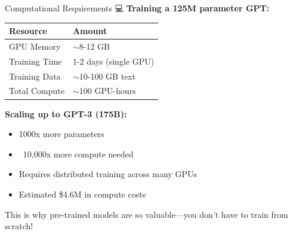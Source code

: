 \documentclass[aspectratio=169]{beamer}
\begin{document}
\begin{frame}{Computational Requirements 💻}
\small
    \textbf{Training a 125M parameter GPT:}

    \vspace{0.3cm}

    \begin{table}
        \begin{tabular}{ll}
            \toprule
            \textbf{Resource} & \textbf{Amount} \\
            \midrule
            GPU Memory & $\sim$8-12 GB \\
            Training Time & 1-2 days (single GPU) \\
            Training Data & $\sim$10-100 GB text \\
            Total Compute & $\sim$100 GPU-hours \\
            \bottomrule
        \end{tabular}
    \end{table}

    \vspace{0.3cm}

    \textbf{Scaling up to GPT-3 (175B):}
    \begin{itemize}\setlength{\itemsep}{0pt}
        \item 1000x more parameters
        \item ~10,000x more compute needed
        \item Requires distributed training across many GPUs
        \item Estimated \$4.6M in compute costs
    \end{itemize}

    \vspace{0.3cm}

    \begin{thinkaboutit}
        This is why pre-trained models are so valuable—you don't have to train from scratch!
    \end{thinkaboutit}
\end{frame}
\end{document}
